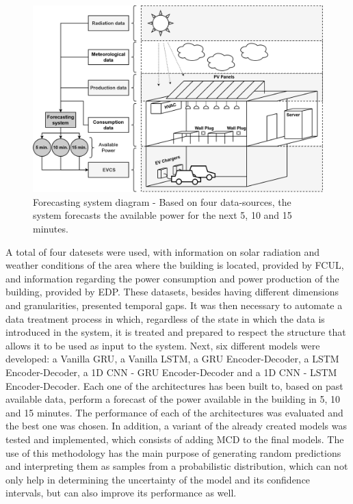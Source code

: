 \begin{figure}[h!]
    \centering
    \begin{center}
    \includegraphics[width=1\textwidth]{Images/BUILDING.png}
    \caption{Forecasting system diagram - Based on four data-sources, the system forecasts the available power for the next 5, 10 and 15 minutes.}
    \label{building}
    \end{center}
\end{figure}


A total of four datesets were used, with information on solar radiation and weather conditions of the area where the building is located, provided by \ac{FCUL}, and information regarding the power consumption and power production of the building, provided by \ac{EDP}. These datasets, besides having different dimensions and granularities, presented temporal gaps. It was then necessary to automate a data treatment process in which, regardless of the state in which the data is introduced in the system, it is treated and prepared to respect the structure that allows it to be used as input to the system. Next, six different models were developed: a Vanilla \ac{GRU}, a Vanilla \ac{LSTM}, a \ac{GRU} Encoder-Decoder, a \ac{LSTM} Encoder-Decoder, a \ac{1D CNN} - \ac{GRU} Encoder-Decoder and a \ac{1D CNN} - \ac{LSTM} Encoder-Decoder. Each one of the architectures has been built to, based on past available data, perform a forecast of the power available in the building in 5, 10 and 15 minutes. The performance of each of the architectures was evaluated and the best one was chosen. In addition, a variant of the already created models was tested and implemented, which consists of adding \ac{MCD} to the final models. The use of this methodology has the main purpose of generating random predictions and interpreting them as samples from a probabilistic distribution, which can not only help in determining the uncertainty of the model and its confidence intervals, but can also improve its performance as well. 

